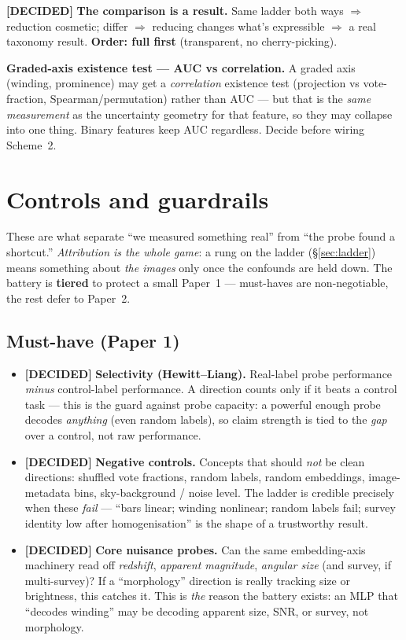 \documentclass[11pt,a4paper]{article}
\newcommand{\dec}{\textcolor{decided}{\sffamily\bfseries[DECIDED]}}
\begin{document}
\dec{} \textbf{The comparison is a result.} Same ladder both ways $\Rightarrow$ reduction
cosmetic; differ $\Rightarrow$ reducing changes what's expressible $\Rightarrow$ a real taxonomy
result. \textbf{Order: full first} (transparent, no cherry-picking).

\begin{openbox}
\textbf{Graded-axis existence test --- AUC vs correlation.} A graded axis (winding, prominence)
may get a \emph{correlation} existence test (projection vs vote-fraction, Spearman/permutation)
rather than AUC --- but that is the \emph{same measurement} as the uncertainty geometry for that
feature, so they may collapse into one thing. Binary features keep AUC regardless. Decide before
wiring Scheme~2.
\end{openbox}

\section{Controls and guardrails}\label{sec:controls}

These are what separate ``we measured something real'' from ``the probe found a shortcut.''
\emph{Attribution is the whole game}: a rung on the ladder (\S\ref{sec:ladder}) means something
about \emph{the images} only once the confounds are held down. The battery is \textbf{tiered} to
protect a small Paper~1 --- must-haves are non-negotiable, the rest defer to Paper~2.

\subsection{Must-have (Paper 1)}
\begin{itemize}[leftmargin=1.4em,itemsep=3pt]
\item \dec{} \textbf{Selectivity (Hewitt--Liang).} Real-label probe performance \emph{minus}
control-label performance. A direction counts only if it beats a control task --- this is the
guard against probe capacity: a powerful enough probe decodes \emph{anything} (even random
labels), so claim strength is tied to the \emph{gap} over a control, not raw performance.
\item \dec{} \textbf{Negative controls.} Concepts that should \emph{not} be clean directions:
shuffled vote fractions, random labels, random embeddings, image-metadata bins, sky-background /
noise level. The ladder is credible precisely when these \emph{fail} --- ``bars linear; winding
nonlinear; random labels fail; survey identity low after homogenisation'' is the shape of a
trustworthy result.
\item \dec{} \textbf{Core nuisance probes.} Can the same embedding-axis machinery read off
\emph{redshift}, \emph{apparent magnitude}, \emph{angular size} (and survey, if multi-survey)?
If a ``morphology'' direction is really tracking size or brightness, this catches it. This is
\emph{the} reason the battery exists: an MLP that ``decodes winding'' may be decoding apparent
size, SNR, or survey, not morphology.
\end{itemize}
\end{document}
